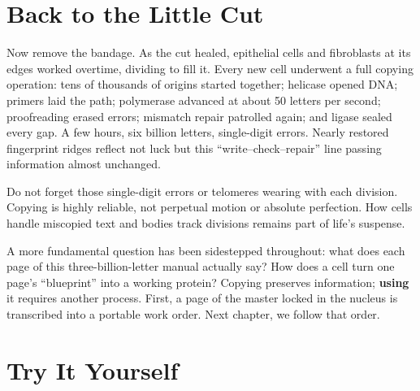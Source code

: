\section{Back to the Little Cut}

Now remove the bandage. As the cut healed, epithelial cells and fibroblasts at its edges worked overtime, dividing to fill it. Every new cell underwent a full copying operation: tens of thousands of origins started together; helicase opened DNA; primers laid the path; polymerase advanced at about 50 letters per second; proofreading erased errors; mismatch repair patrolled again; and ligase sealed every gap. A few hours, six billion letters, single-digit errors. Nearly restored fingerprint ridges reflect not luck but this ``write--check--repair'' line passing information almost unchanged.

Do not forget those single-digit errors or telomeres wearing with each division. Copying is highly reliable, not perpetual motion or absolute perfection. How cells handle miscopied text and bodies track divisions remains part of life's suspense.

A more fundamental question has been sidestepped throughout: what does each page of this three-billion-letter manual actually say? How does a cell turn one page's ``blueprint'' into a working protein? Copying preserves information; \textbf{using} it requires another process. First, a page of the master locked in the nucleus is transcribed into a portable work order. Next chapter, we follow that order.

\section*{Try It Yourself}

